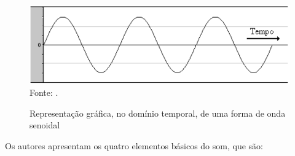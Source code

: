 \begin{figure}[!htb]
   \centering
   \caption{Representação gráfica, no domínio temporal, de uma forma de onda senoidal}\label{fig:ondaSenoidal} 
   \includegraphics[scale=0.6]{figuras/ondaSenoidal.png}
   Fonte: \cite{miletto2004}.
\end{figure}

Os autores  apresentam os quatro elementos básicos do som, que são:
